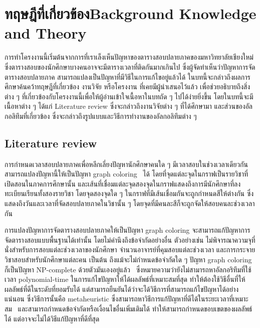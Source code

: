 \chapter{\ifcpe ทฤษฎีที่เกี่ยวข้อง\else Background Knowledge and Theory\fi}

การทำโครงงานนี้เริ่มต้นจากการที่เราเล็งเห็นปัญหาของตารางสอบปลายภาคของมหาวิทยาลัยเชียงใหม่ 
ซึ่งตารางสอบของนักศึกษาบางคนอาจจะมีตารางเวลาที่ติดกันมากเกินไป ซึ่งผู้จัดทำเห็นว่าปัญหาการจัดตารางสอบปลายภาค
สามารถแปลงเป็นปัญหาที่มีวิธีในการแก้ไขอยู่แล้วได้ ในบทนี้จะกล่าวถึงผลการศึกษาค้นคว้าทฤษฎีที่เกี่ยวข้อง งานวิจัย หรือโครงงาน ที่เคยมีผู้นำเสนอไว้แล้ว
เพื่อช่วยอธิบายถึงสิ่งต่าง ๆ ที่เกี่ยวข้องกับโครงงานนี้เพื่อให้ผู้อ่านเข้าใจเนื้อหาในบทถัด ๆ ไปได้ง่ายยิ่งขึ้น โดยในบทนี้จะมีเนื้อหาต่าง ๆ ได้แก่ Literature review 
ซึ่งจะกล่าวถึงงานวิจัยต่าง ๆ ที่ได้ศึกษามา และส่วนของอัลกอลิทึมที่เกี่ยวข้อง ซึ่งจะกล่าวถึงรูปแบบและวิธีการทำงานของอัลกอลิทึมต่าง ๆ 
\section{Literature review}
การกำหนดเวลาสอบปลายภาคเพื่อหลีกเลี่ยงปัญหานักศึกษาคนใด ๆ มีเวลาสอบในช่วงเวลาเดียวกันสามารถแปลงปัญหานี้ให้เป็นปัญหา graph coloring~\cite{mcs} ได้ 
โดยที่จุดแต่ละจุดในกราฟเป็นรายวิชาที่เปิดสอนในภาคการศึกษานั้น 
และเส้นที่เชื่อมแต่ละจุดสองจุดในกราฟแสดงถึงการมีนักศึกษาที่ลงทะเบียนเรียนทั้งสองรายวิชา โดยจุดสองจุดใด ๆ ในกราฟที่มีเส้นเชื่อมกันจะถูกกำหนดสีให้ต่างกัน
ซึ่งแสดงถึงวันและเวลาที่จัดสอบปลายภาคในวิชานั้น ๆ โดยจุดที่มีคนละสีก็จะถูกจัดให้สอบคนละช่วงเวลากัน

การแปลงปัญหาการจัดตารางสอบปลายภาคให้เป็นปัญหา graph coloring จะสามารถแก้ปัญหาการจัดตารางสอบแบบพื้นฐานได้เท่านั้น โดยไม่คำนึงถึงข้อจำกัดอย่างอื่น 
ตัวอย่างเช่น ไม่พิจารณาความจุที่นั่งสำหรับการสอบแต่ละช่วงเวลาของนักศึกษา จำนวนอาจารย์ที่คุมสอบแต่ละช่วงเวลา และการกระจายวิชาสอบสำหรับนักศึกษาแต่ละคน เป็นต้น
ถึงแม้จะไม่กำหนดข้อจำกัดใด ๆ ปัญหา graph coloring ก็เป็นปัญหา NP-complete ด้วยตัวมันเองอยู่แล้ว~\cite{alg-design} 
ซึ่งหมายความว่ายังไม่สามารถหาอัลกอริทึมที่ใช้เวลา polynomial-time ในการแก้ไขปัญหาให้ได้ผลลัพธ์ที่เหมาะสมที่สุด 
ทำให้ต้องใช้วิธีอื่นที่ให้ผลลัพธ์ที่ดีในระดับที่ยอมรับได้ แต่สามารถยืนยันได้ว่าจะได้วิธีการที่สามารถแก้ไขปัญหาได้อย่างแน่นอน 
ซึ่งวิธีการนั้นคือ metaheuristic ซึ่งสามารถหาวิธีการแก้ปัญหาที่ดีได้ในระยะเวลาที่เหมาะสม~\cite{meta-for-vertexcolor}
และสามารถกำหนดข้อจำกัดหรือเงื่อนไขอื่นเพิ่มเติมได้ ทำให้สามารถกำหนดขอบเขตของผลลัพธ์ได้ แต่อาจจะไม่ได้วิธีแก้ปัญหาที่ดีที่สุด

